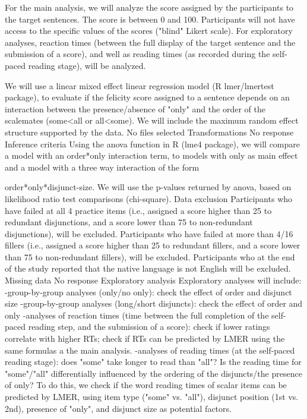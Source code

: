 For the main analysis, we will analyze the score assigned by the participants to the target sentences. The
score is between 0 and 100. Participants will not have access to the specific values of the scores ("blind"
Likert scale).
For exploratory analyses, reaction times (between the full display of the target sentence and the
submission of a score), and well as reading times (as recorded during the self-paced reading stage), will
be analyzed.


We will use a linear mixed effect linear regression model (R lmer/lmertest package), to evaluate if the
felicity score assigned to a sentence depends on an interaction between the presence/absence of "only"
and the order of the scalemates (some<all or all<some). We will include the maximum random effect
structure supported by the data.
No files selected
Transformations
No response
Inference criteria
Using the anova function in R (lme4 package), we will compare a model with an order*only interaction
term, to models with only as main effect and a model with a three way interaction of the form

order*only*disjunct-size.
We will use the p-values returned by anova, based on likelihood ratio test comparisons (chi-square).
Data exclusion
Participants who have failed at all 4 practice items (i.e., assigned a score higher than 25 to redundant
disjunctions, and a score lower than 75 to non-redundant disjunctions), will be excluded.
Participants who have failed at more than 4/16 fillers (i.e., assigned a score higher than 25 to redundant
fillers, and a score lower than 75 to non-redundant fillers), will be excluded.
Participants who at the end of the study reported that the native language is not English will be
excluded.
Missing data
No response
Exploratory analysis
Exploratory analyses will include:
-group-by-group analyses (only/no only): check the effect of order and disjunct size
-group-by-group analyses (long/short disjuncts): check the effect of order and only
-analyses of reaction times (time between the full completion of the self-paced reading step, and the
submission of a score): check if lower ratings correlate with higher RTs; check if RTs can be predicted by
LMER using the same formulas a the main analysis.
-analyses of reading times (at the self-paced reading stage): does "some" take longer to read than "all"?
Is the reading time for "some"/"all" differentially influenced by the ordering of the disjuncts/the
presence of only? To do this, we check if the word reading times of scalar items can be predicted by
LMER, using item type ("some" vs. "all"), disjunct position (1st vs. 2nd), presence of "only", and disjunct
size as potential factors.

